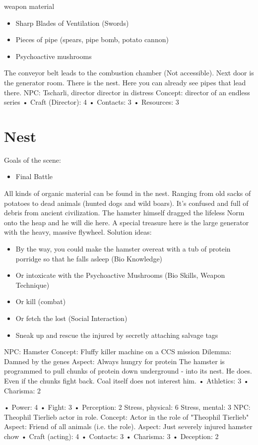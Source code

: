weapon material

\begin{itemize}
\item Sharp Blades of Ventilation (Swords)
\item Pieces of pipe (spears, pipe bomb, potato cannon)
\item Psychoactive mushrooms
\end{itemize}

The conveyor belt leads to the combustion chamber (Not accessible). Next door is the generator room. There is the nest.
Here you can already see pipes that lead there.
NPC: Tscharli, director
director in distress
Concept: director of an endless series
• Craft (Director): 4
• Contacts: 3
• Resources: 3

\section{Nest}
Goals of the scene:
\begin{itemize}
\item Final Battle
\end{itemize}
All kinds of organic material can be found in the nest. Ranging from old sacks of potatoes to dead animals (hunted dogs and wild
boars).
It's confused and full of debris from ancient civilization.
The hamster himself dragged the lifeless Norm onto the heap and he will die here.
A special treasure here is the large generator with the heavy, massive flywheel.
Solution ideas:
\begin{itemize}
\item By the way, you could make the hamster overeat with a tub of protein porridge so that he falls asleep (Bio
Knowledge)
\item Or intoxicate with the Psychoactive Mushrooms (Bio Skills, Weapon Technique)
\item Or kill (combat)
\item Or fetch the lost (Social Interaction)
\item Sneak up and rescue the injured by secretly attaching salvage tags
\end{itemize}
NPC: Hamster
Concept: Fluffy killer machine on a CCS mission
Dilemma: Damned by the genes
Aspect: Always hungry for protein
The hamster is programmed to pull chunks of protein down underground - into its nest. He does.
Even if the chunks fight back. Coal itself does not interest him.
• Athletics: 3
• Charisma: 2

• Power: 4
• Fight: 3
• Perception: 2
Stress, physical: 6
Stress, mental: 3
NPC: Theophil Tierlieb
actor in role.
Concept: Actor in the role of "Theophil Tierlieb"
Aspect: Friend of all animals (i.e. the role).
Aspect: Just severely injured hamster chow
• Craft (acting): 4
• Contacts: 3
• Charisma: 3
• Deception: 2

